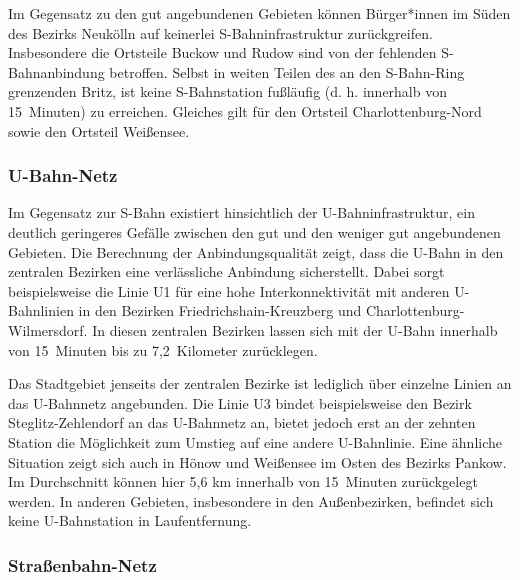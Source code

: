 
Im Gegensatz zu den gut angebundenen Gebieten können Bürger*innen im Süden des Bezirks Neukölln auf keinerlei S-Bahninfrastruktur zurückgreifen. Insbesondere die Ortsteile Buckow und Rudow sind von der fehlenden S-Bahnanbindung betroffen. Selbst in weiten Teilen des an den S-Bahn-Ring grenzenden Britz, ist keine S-Bahnstation fußläufig (d. h. innerhalb von 15~Minuten) zu erreichen. Gleiches gilt für den Ortsteil Charlottenburg-Nord sowie den Ortsteil Weißensee.

\subsubsection{U-Bahn-Netz}

Im Gegensatz zur S-Bahn existiert hinsichtlich der U-Bahninfrastruktur, ein deutlich geringeres Gefälle zwischen den gut und den weniger gut angebundenen Gebieten. Die Berechnung der Anbindungsqualität zeigt, dass die U-Bahn in den zentralen Bezirken eine verlässliche Anbindung sicherstellt. Dabei sorgt beispielsweise die Linie U1 für eine hohe Interkonnektivität mit anderen U-Bahnlinien in den Bezirken Friedrichshain-Kreuzberg und Charlottenburg-Wilmersdorf. In diesen zentralen Bezirken lassen sich mit der U-Bahn innerhalb von 15~Minuten bis zu 7,2~Kilometer zurücklegen.


Das Stadtgebiet jenseits der zentralen Bezirke ist lediglich über einzelne Linien an das U-Bahnnetz angebunden. Die Linie U3 bindet beispielsweise den Bezirk Steglitz-Zehlendorf an das U-Bahnnetz an, bietet jedoch erst an der zehnten Station die Möglichkeit zum Umstieg auf eine andere U-Bahnlinie. Eine ähnliche Situation zeigt sich auch in Hönow und Weißensee im Osten des Bezirks Pankow. Im Durchschnitt können hier 5,6 km innerhalb von 15~Minuten zurückgelegt werden. In anderen Gebieten, insbesondere in den Außenbezirken, befindet sich keine U-Bahnstation in Laufentfernung.

\subsubsection{Straßenbahn-Netz}

